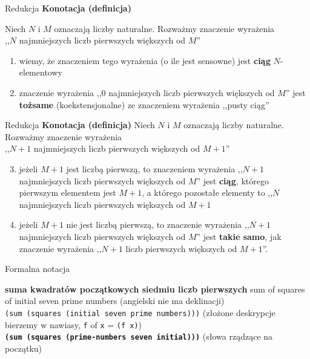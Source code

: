 \documentclass{beamer}
\begin{document}
\begin{frame}{Redukcja}
  \textbf{Konotacja (definicja)}
 
  Niech $N$ i $M$ oznaczają liczby naturalne. Rozważmy znaczenie wyrażenia \\
  ,,$N$ najmniejszych liczb pierwszych większych od $M$'' \pause \\

  \begin{enumerate}
  \item wiemy, że znaczeniem tego wyrażenia (o ile jest sensowne)
    jest \textbf{ciąg} $N$-elementowy \pause
    
  \item znaczenie wyrażenia ,,$0$ najmniejszych liczb pierwszych
    większych od $M$'' jest \textbf{tożsame} (koekstensjonalne)
    ze znaczeniem wyrażenia ,,pusty ciąg''
  \end{enumerate}
    
\end{frame}

\begin{frame}{Redukcja}
  \textbf{Konotacja (definicja)} 
  Niech $N$ i $M$ oznaczają liczby naturalne. Rozważmy znaczenie wyrażenia \\
  ,,$N+1$ najmniejszych liczb pierwszych większych od $M+1$'' \pause \\

  \begin{enumerate}
    \setcounter{enumi}{2}
    \item jeżeli $M+1$ jest liczbą pierwszą, to znaczeniem wyrażenia
    ,,$N+1$ najmniejszych liczb pierwszych większych od $M$'' jest \textbf{ciąg},
    którego pierwszym elementem jest $M+1$, a którego pozostałe elementy
    to ,,$N$ najmniejszych liczb pierwszych większych od $M+1$ \pause
    
  \item jeżeli $M+1$ nie jest liczbą pierwszą, to znaczenie wyrażenia
    ,,$N+1$ najmniejszych liczb pierwszych większych od $M$'' jest
    \textbf{takie samo}, jak znaczenie wyrażenia ,,$N+1$ liczb pierwszych większych
    od $M+1$''.
  \end{enumerate}
\end{frame}

\begin{frame}
\end{frame}

\begin{frame}{Formalna notacja}

  \textbf{suma kwadratów początkowych siedmiu liczb pierwszych}
  \pause
  sum of squares of initial seven prime numbers 
  {\tiny (angielski nie ma deklinacji)} \\
  \pause
  \texttt{(sum (squares (initial seven prime numbers)))} {\tiny(złożone
    deskrypcje bierzemy w nawiasy, \texttt{f} of \texttt{x} = \texttt{(f x)})} \\
  \pause
  \textbf{\texttt{(sum (squares (prime-numbers seven initial)))}}
  {\tiny(słowa rządzące na początku)} \\

\end{frame}
\end{document}
